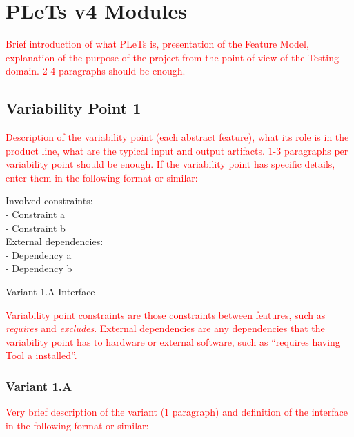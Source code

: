 \chapter{PLeTs v4 Modules}
\label{ch:modules}

\textcolor{red}{Brief introduction of what PLeTs is, presentation of the Feature Model, explanation of the purpose of the project from the point of view of the Testing domain. 2-4 paragraphs should be enough.}


\section{Variability Point 1}

\textcolor{red}{Description of the variability point (each abstract feature), what its role is in the product line, what are the typical input and output artifacts. 1-3 paragraphs per variability point should be enough. If the variability point has specific details, enter them in the following format or similar:}

\begin{listing}
Involved constraints:
\\  - Constraint a
\\  - Constraint b
\\External dependencies:
\\  - Dependency a
\\  - Dependency b
\caption{Variant 1.A Interface}
\end{listing}

\textcolor{red}{Variability point constraints are those constraints between features, such as \emph{requires} and \emph{excludes}. External dependencies are any dependencies that the variability point has to hardware or external software, such as ``requires having Tool a installed''.}


\subsection{Variant 1.A}

\textcolor{red}{Very brief description of the variant (1 paragraph) and definition of the interface in the following format or similar:}

